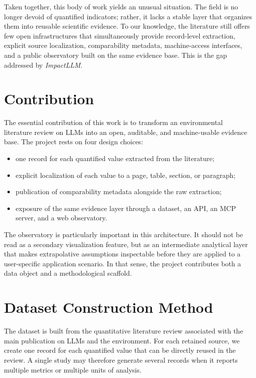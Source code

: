 \documentclass[11pt,a4paper]{article}
\begin{document}
Taken together, this body of work yields an unusual situation. The field is no longer devoid of quantified indicators; rather, it lacks a stable layer that organizes them into reusable scientific evidence. To our knowledge, the literature still offers few open infrastructures that simultaneously provide record-level extraction, explicit source localization, comparability metadata, machine-access interfaces, and a public observatory built on the same evidence base. This is the gap addressed by \emph{ImpactLLM}.

\section{Contribution}
The essential contribution of this work is to transform an environmental literature review on LLMs into an open, auditable, and machine-usable evidence base. The project rests on four design choices:
\begin{itemize}
\item one record for each quantified value extracted from the literature;
\item explicit localization of each value to a page, table, section, or paragraph;
\item publication of comparability metadata alongside the raw extraction;
\item exposure of the same evidence layer through a dataset, an API, an MCP server, and a web observatory.
\end{itemize}

The observatory is particularly important in this architecture. It should not be read as a secondary visualization feature, but as an intermediate analytical layer that makes extrapolative assumptions inspectable before they are applied to a user-specific application scenario. In that sense, the project contributes both a data object and a methodological scaffold.

\section{Dataset Construction Method}
The dataset is built from the quantitative literature review associated with the main publication on LLMs and the environment. For each retained source, we create one record for each quantified value that can be directly reused in the review. A single study may therefore generate several records when it reports multiple metrics or multiple units of analysis.
\end{document}
